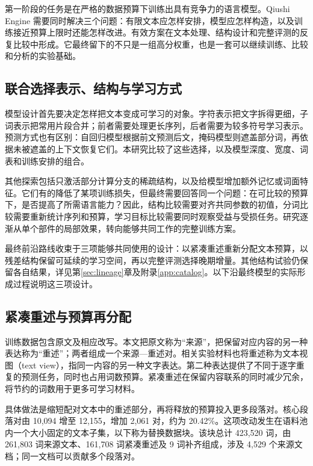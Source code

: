 \label{sec:frontier}

第一阶段的任务是在严格的数据预算下训练出具有竞争力的语言模型。Qiushi Engine 需要同时解决三个问题：有限文本应怎样安排，模型应怎样构造，以及训练接近预算上限时还能怎样改进。有效方案在文本处理、结构设计和完整评测的反复比较中形成。它最终留下的不只是一组高分权重，也是一套可以继续训练、比较和分析的实验基础。

\subsection{联合选择表示、结构与学习方式}

模型设计首先要决定怎样把文本变成可学习的对象。字符表示把文字拆得更细，子词表示把常用片段合并；前者需要处理更长序列，后者需要为较多符号学习表示。预测方式也有区别：自回归模型根据前文预测后文，掩码模型则遮盖部分词，再依据未被遮盖的上下文恢复它们。本研究比较了这些选择，以及模型深度、宽度、词表和训练安排的组合。

其他探索包括只激活部分计算分支的稀疏结构，以及给模型增加额外记忆或词面特征。它们有的降低了某项训练损失，但最终需要回答同一个问题：在可比较的预算下，是否提高了所需语言能力？因此，结构比较需要对齐共同参数的初值，分词比较需要重新统计序列和预算，学习目标比较需要同时观察受益与受损任务。研究逐渐从单个部件的局部效果，转向能够共同工作的完整训练方案。

最终前沿路线收束于三项能够共同使用的设计：以紧凑重述重新分配文本预算，以残差结构保留可延续的学习空间，再以完整评测选择晚期增量。其他结构试验仍保留各自结果，详见第\ref{sec:lineage}章及附录\ref{app:catalog}。以下沿最终模型的实际形成过程说明这三项设计。

\subsection{紧凑重述与预算再分配}

训练数据包含原文及相应改写。本文把原文称为“来源”，把保留对应内容的另一种表达称为“重述”；两者组成一个来源—重述对。相关实验材料也将重述称为文本视图（text view），指同一内容的另一种文字表达。第二种表达提供了不同于逐字重复的预测任务，同时也占用词数预算。紧凑重述在保留内容联系的同时减少冗余，将节约的词数用于更多可学习材料。

具体做法是缩短配对文本中的重述部分，再将释放的预算投入更多段落对。核心段落对由 10,094 增至 12,155，增加 2,061 对，约为 20.42\%。这项改动发生在语料池内一个大小固定的文本子集，以下称为替换数据块。该块总计 423,520 词，由 261,803 词来源文本、161,708 词紧凑重述及 9 词补齐组成，涉及 4,529 个来源文档；同一文档可以贡献多个段落对。


